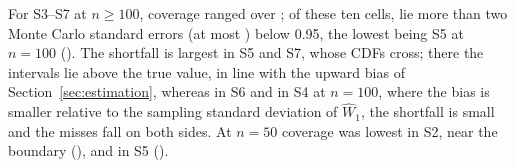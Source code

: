 \documentclass[AMA,Times1COL]{WileyNJDv5}
\begin{document}
For S3--S7 at $n \geq 100$, coverage ranged over ; of these ten cells,  lie more than two Monte Carlo standard errors (at most ) below 0.95, the lowest being S5 at $n = 100$ (). The shortfall is largest in S5 and S7, whose CDFs cross; there the intervals lie above the true value, in line with the upward bias of Section~\ref{sec:estimation}, whereas in S6 and in S4 at $n = 100$, where the bias is smaller relative to the sampling standard deviation of $\widehat{W}_1$, the shortfall is small and the misses fall on both sides. At $n = 50$ coverage was lowest in S2, near the boundary (), and in S5 ().%
\end{document}
